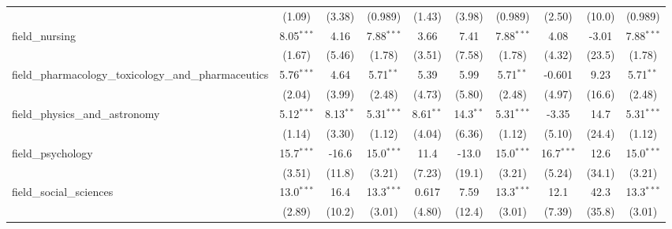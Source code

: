 \begin{tabular}{lccccccccc}
                                                               & (1.09)        & (3.38)        & (0.989)       & (1.43)        & (3.98)        & (0.989)       & (2.50)        & (10.0)        & (0.989)\\   
   field\_nursing                                              & 8.05$^{***}$  & 4.16          & 7.88$^{***}$  & 3.66          & 7.41          & 7.88$^{***}$  & 4.08          & -3.01         & 7.88$^{***}$\\   
                                                               & (1.67)        & (5.46)        & (1.78)        & (3.51)        & (7.58)        & (1.78)        & (4.32)        & (23.5)        & (1.78)\\   
   field\_pharmacology\_toxicology\_and\_pharmaceutics         & 5.76$^{***}$  & 4.64          & 5.71$^{**}$   & 5.39          & 5.99          & 5.71$^{**}$   & -0.601        & 9.23          & 5.71$^{**}$\\   
                                                               & (2.04)        & (3.99)        & (2.48)        & (4.73)        & (5.80)        & (2.48)        & (4.97)        & (16.6)        & (2.48)\\   
   field\_physics\_and\_astronomy                              & 5.12$^{***}$  & 8.13$^{**}$   & 5.31$^{***}$  & 8.61$^{**}$   & 14.3$^{**}$   & 5.31$^{***}$  & -3.35         & 14.7          & 5.31$^{***}$\\   
                                                               & (1.14)        & (3.30)        & (1.12)        & (4.04)        & (6.36)        & (1.12)        & (5.10)        & (24.4)        & (1.12)\\   
   field\_psychology                                           & 15.7$^{***}$  & -16.6         & 15.0$^{***}$  & 11.4          & -13.0         & 15.0$^{***}$  & 16.7$^{***}$  & 12.6          & 15.0$^{***}$\\   
                                                               & (3.51)        & (11.8)        & (3.21)        & (7.23)        & (19.1)        & (3.21)        & (5.24)        & (34.1)        & (3.21)\\   
   field\_social\_sciences                                     & 13.0$^{***}$  & 16.4          & 13.3$^{***}$  & 0.617         & 7.59          & 13.3$^{***}$  & 12.1          & 42.3          & 13.3$^{***}$\\   
                                                               & (2.89)        & (10.2)        & (3.01)        & (4.80)        & (12.4)        & (3.01)        & (7.39)        & (35.8)        & (3.01)\\   

\end{tabular}
